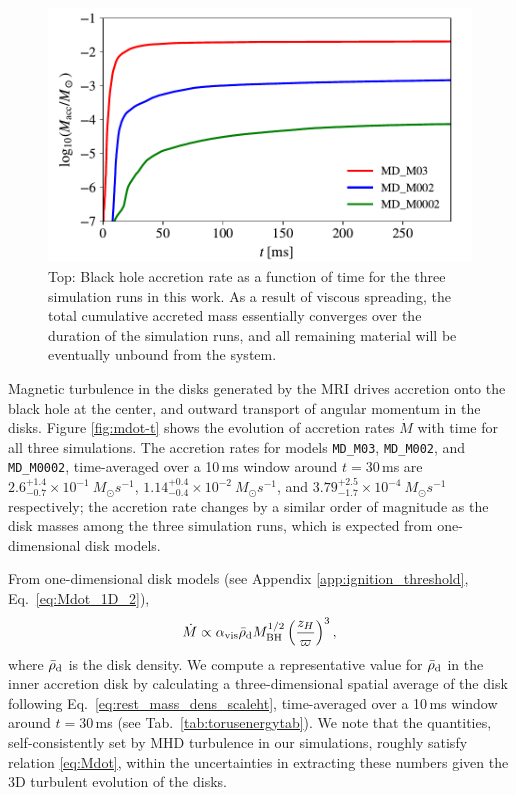 \begin{figure}[t]
  \includegraphics[width=\columnwidth]{figures/kilonova/Macc_multidets_sims.pdf}
 \caption{Top: Black hole accretion rate as a function of time for the three simulation runs in this work. As a result of viscous spreading, the total cumulative accreted mass essentially converges over the duration of the simulation runs, and all remaining material will be eventually unbound from the system. \label{fig:macc-t}}
\end{figure}

Magnetic turbulence in the disks generated by the MRI drives accretion onto the black hole at the center, and outward transport of angular momentum in the disks. Figure \ref{fig:mdot-t} shows the evolution of accretion rates $\dot M$ with time for all three simulations. The accretion rates for models \texttt{MD\_M03}, \texttt{MD\_M002}, and \texttt{MD\_M0002}, time-averaged over a 10\,ms window around $t=30$\,ms are $2.6_{-0.7}^{+1.4}\times 10^{-1}~M_\odot s^{-1}$, 
$1.14_{-0.4}^{+0.4}\times 10^{-2}~M_\odot s^{-1}$, and $3.79_{-1.7}^{+2.5}\times 10^{-4}~M_\odot s^{-1}$ respectively; the accretion rate changes by a similar order of magnitude as the disk masses among the three simulation runs, which is expected from one-dimensional disk models.

From one-dimensional disk models (see Appendix \ref{app:ignition_threshold}, Eq.~\eqref{eq:Mdot_1D_2}),
\begin{equation}
    \dot{M} \propto \alpha_{\rm vis} \bar{\rho}_{\rm d} M_{\rm BH}^{1/2} \left(\frac{z_H}{\varpi}\right)^3, \label{eq:Mdot}
\end{equation}
where $\bar{\rho}_{\rm d}$ is the disk density. We compute a representative value for $\bar{\rho}_{\rm d}$ in the inner accretion disk by calculating a three-dimensional spatial average of the disk following Eq.~\eqref{eq:rest_mass_dens_scaleht}, time-averaged over a 10\,ms window around $t=30$\,ms (see Tab.~\ref{tab:torusenergytab}). We note that the quantities, self-consistently set by MHD turbulence in our simulations, roughly satisfy relation \eqref{eq:Mdot}, within the uncertainties in extracting these numbers given the 3D turbulent evolution of the disks.

